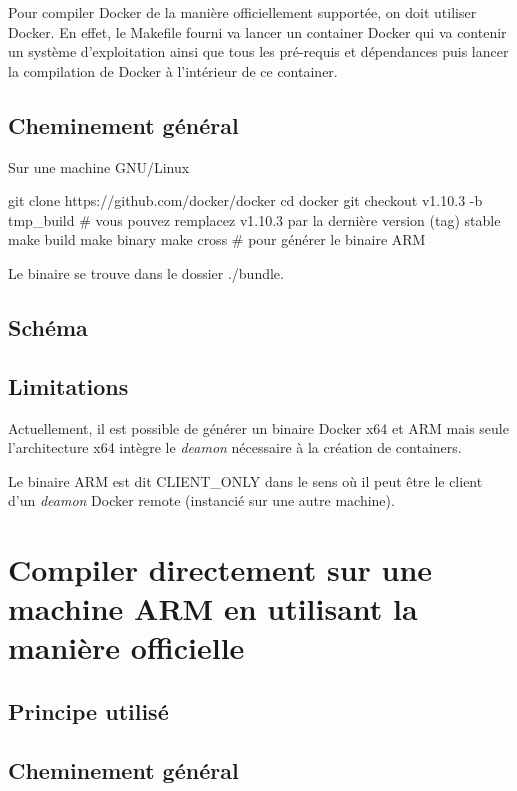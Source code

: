 \documentclass[11pt,a4paper,oneside]{article}
\begin{document}
Pour compiler Docker de la manière officiellement supportée, on doit utiliser Docker. En effet, le Makefile fourni va lancer un container Docker qui va contenir un système d'exploitation ainsi que tous les pré-requis et dépendances puis lancer la compilation de Docker à l'intérieur de ce container.

\subsection{Cheminement général}

Sur une machine GNU/Linux

\begin{bashcode}
git clone https://github.com/docker/docker
cd docker
git checkout v1.10.3 -b tmp_build # vous pouvez remplacez v1.10.3 par la dernière version (tag) stable
make build
make binary
make cross # pour générer le binaire ARM
\end{bashcode}

Le binaire se trouve dans le dossier ./bundle.

\subsection{Schéma}

\subsection{Limitations}

Actuellement, il est possible de générer un binaire Docker x64 et ARM mais seule l'architecture x64 intègre le \emph{deamon} nécessaire à la création de containers.

Le binaire ARM est dit CLIENT\_ONLY dans le sens où il peut être le client d'un \emph{deamon} Docker remote (instancié sur une autre machine).



\section{Compiler directement sur une machine ARM en utilisant la manière officielle}

\subsection{Principe utilisé}

\subsection{Cheminement général}
\end{document}
